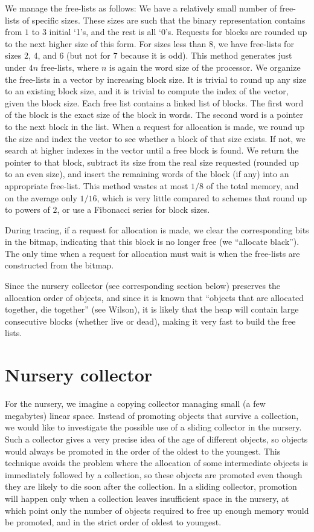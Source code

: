 We manage the free-lists as follows:  We have a relatively small
number of free-lists of specific sizes.  These sizes are such that the
binary representation contains from $1$ to $3$ initial `1's, and the
rest is all `0's.  Requests for blocks are rounded up to the next
higher size of this form.  For sizes less than $8$, we have free-lists
for sizes $2$, $4$, and $6$ (but not for $7$ because it is odd).  This
method generates just under $4n$ free-lists, where $n$ is again the
word size of the processor.  We organize the free-lists in a vector
by increasing block size.  It is trivial to round up any size to an
existing block size, and it is trivial to compute the index of the
vector, given the block size.  Each free list contains a linked list
of blocks.  The first word of the block is the exact size of the block
in words.  The second word is a pointer to the next block in the
list.  When a request for allocation is made, we round up the size and
index the vector to see whether a block of that size exists.  If not,
we search at higher indexes in the vector until a free block is
found.  We return the pointer to that block, subtract its size from
the real size requested (rounded up to an even size), and insert the
remaining words of the block (if any) into an appropriate free-list.  
This method wastes at most $1/8$ of the total memory, and on the
average only $1/16$, which is very little compared to schemes that
round up to powers of $2$, or use a Fibonacci series for block sizes. 

During tracing, if a request for allocation is made, we clear the
corresponding bits in the bitmap, indicating that this block is no
longer free (we ``allocate black'').  The only time when a request for
allocation must wait is when the free-lists are constructed from the
bitmap. 

Since the nursery collector (see corresponding section below) preserves
the allocation order of objects, and since it is known that ``objects
that are allocated together, die together'' (see Wilson), it is likely
that the heap will contain large consecutive blocks (whether live or
dead), making it very fast to build the free lists. 

\section{Nursery collector}
For the nursery, we imagine a copying collector managing small (a few
megabytes) linear space.  Instead of promoting objects that survive a
collection, we would like to investigate the possible use of a sliding
collector in the nursery.  Such a collector gives a very precise idea
of the age of different objects, so objects would always be promoted
in the order of the oldest to the youngest.  This technique avoids the
problem where the allocation of some intermediate objects is
immediately followed by a collection, so these objects are promoted
even though they are likely to die soon after the collection.  In a
sliding collector, promotion will happen only when a collection leaves
insufficient space in the nursery, at which point only the number of
objects required to free up enough memory would be promoted, and in
the strict order of oldest to youngest. 

